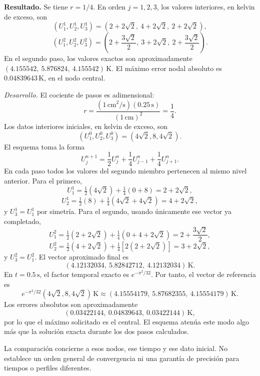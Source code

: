 \noindent\textbf{Resultado.} Se tiene \(r=1/4\). En orden \(j=1,2,3\), los valores interiores, en kelvin de exceso, son
\[
(U_1^1,U_2^1,U_3^1)=(2+2\sqrt2,\ 4+2\sqrt2,\ 2+2\sqrt2),
\]
\[
(U_1^2,U_2^2,U_3^2)=\left(2+\frac{3\sqrt2}{2},\ 3+2\sqrt2,\ 2+\frac{3\sqrt2}{2}\right).
\]
En el segundo paso, los valores exactos son aproximadamente \((4.155542,\ 5.876824,\ 4.155542)\,\mathrm K\). El máximo error nodal absoluto es \(0.04839643\,\mathrm K\), en el nodo central.

\noindent\textit{Desarrollo.} El cociente de pasos es adimensional:
\[
r=\frac{(1\,\mathrm{cm^2/s})(0.25\,\mathrm s)}{(1\,\mathrm{cm})^2}=\frac14.
\]
Los datos interiores iniciales, en kelvin de exceso, son
\[
(U_1^0,U_2^0,U_3^0)=(4\sqrt2,8,4\sqrt2).
\]
El esquema toma la forma
\[
U_j^{n+1}=\frac12U_j^n+\frac14U_{j-1}^n+\frac14U_{j+1}^n.
\]
En cada paso todos los valores del segundo miembro pertenecen al mismo nivel anterior. Para el primero,
\[
U_1^1=\tfrac12(4\sqrt2)+\tfrac14(0+8)=2+2\sqrt2,
\]
\[
U_2^1=\tfrac12(8)+\tfrac14(4\sqrt2+4\sqrt2)=4+2\sqrt2,
\]
y \(U_3^1=U_1^1\) por simetría. Para el segundo, usando únicamente ese vector ya completado,
\[
U_1^2=\tfrac12(2+2\sqrt2)+\tfrac14(0+4+2\sqrt2)
=2+\frac{3\sqrt2}{2},
\]
\[
U_2^2=\tfrac12(4+2\sqrt2)+\tfrac14[2(2+2\sqrt2)]
=3+2\sqrt2,
\]
y \(U_3^2=U_1^2\). El vector aproximado final es
\[
(4.12132034,\ 5.82842712,\ 4.12132034)\,\mathrm K.
\]
En \(t=0.5\,\mathrm s\), el factor temporal exacto es \(e^{-\pi^2/32}\). Por tanto, el vector de referencia es
\[
e^{-\pi^2/32}(4\sqrt2,8,4\sqrt2)\,\mathrm K
\approx(4.15554179,\ 5.87682355,\ 4.15554179)\,\mathrm K.
\]
Los errores absolutos son aproximadamente
\[
(0.03422144,\ 0.04839643,\ 0.03422144)\,\mathrm K,
\]
por lo que el máximo solicitado es el central. El esquema atenúa este modo algo más que la solución exacta durante los dos pasos calculados.

La comparación concierne a esos nodos, ese tiempo y ese dato inicial. No establece un orden general de convergencia ni una garantía de precisión para tiempos o perfiles diferentes.
